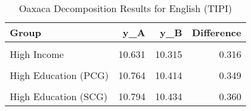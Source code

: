 \begin{table}[!h]

\caption{Oaxaca Decomposition Results for English (TIPI)}
\centering
\begin{tabular}[t]{lrrr}
\toprule
Group & y\_A & y\_B & Difference\\
\midrule
\cellcolor{gray!6}{Low Income} & \cellcolor{gray!6}{10.137} & \cellcolor{gray!6}{9.812} & \cellcolor{gray!6}{0.325}\\
High Income & 10.631 & 10.315 & 0.316\\
\cellcolor{gray!6}{Low Education (PCG)} & \cellcolor{gray!6}{10.223} & \cellcolor{gray!6}{9.899} & \cellcolor{gray!6}{0.324}\\
High Education (PCG) & 10.764 & 10.414 & 0.349\\
\cellcolor{gray!6}{Low Education (SCG)} & \cellcolor{gray!6}{10.223} & \cellcolor{gray!6}{9.898} & \cellcolor{gray!6}{0.325}\\
\addlinespace
High Education (SCG) & 10.794 & 10.434 & 0.360\\
\bottomrule
\end{tabular}
\end{table}
